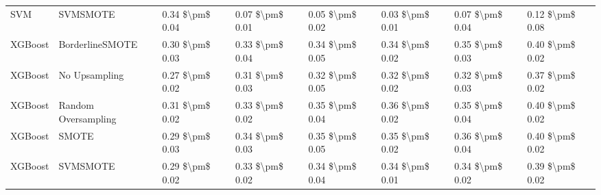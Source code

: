 \begin{tabular}{llllllll}
                            SVM &                      SVMSMOTE & 0.34 \$\textbackslash pm\$ 0.04 &           0.07 \$\textbackslash pm\$ 0.01 &       0.05 \$\textbackslash pm\$ 0.02 &        0.03 \$\textbackslash pm\$ 0.01 &                         0.07 \$\textbackslash pm\$ 0.04 & 0.12 \$\textbackslash pm\$ 0.08 \\
                        XGBoost &               BorderlineSMOTE & 0.30 \$\textbackslash pm\$ 0.03 &           0.33 \$\textbackslash pm\$ 0.04 &       0.34 \$\textbackslash pm\$ 0.05 &        0.34 \$\textbackslash pm\$ 0.02 &                         0.35 \$\textbackslash pm\$ 0.03 & 0.40 \$\textbackslash pm\$ 0.02 \\
                        XGBoost &                 No Upsampling & 0.27 \$\textbackslash pm\$ 0.02 &           0.31 \$\textbackslash pm\$ 0.03 &       0.32 \$\textbackslash pm\$ 0.05 &        0.32 \$\textbackslash pm\$ 0.02 &                         0.32 \$\textbackslash pm\$ 0.03 & 0.37 \$\textbackslash pm\$ 0.02 \\
                        XGBoost &           Random Oversampling & 0.31 \$\textbackslash pm\$ 0.02 &           0.33 \$\textbackslash pm\$ 0.02 &       0.35 \$\textbackslash pm\$ 0.04 &        0.36 \$\textbackslash pm\$ 0.02 &                         0.35 \$\textbackslash pm\$ 0.04 & 0.40 \$\textbackslash pm\$ 0.02 \\
                        XGBoost &                         SMOTE & 0.29 \$\textbackslash pm\$ 0.03 &           0.34 \$\textbackslash pm\$ 0.03 &       0.35 \$\textbackslash pm\$ 0.05 &        0.35 \$\textbackslash pm\$ 0.02 &                         0.36 \$\textbackslash pm\$ 0.04 & 0.40 \$\textbackslash pm\$ 0.02 \\
                        XGBoost &                      SVMSMOTE & 0.29 \$\textbackslash pm\$ 0.02 &           0.33 \$\textbackslash pm\$ 0.02 &       0.34 \$\textbackslash pm\$ 0.04 &        0.34 \$\textbackslash pm\$ 0.01 &                         0.34 \$\textbackslash pm\$ 0.02 & 0.39 \$\textbackslash pm\$ 0.02 \\
\bottomrule
\end{tabular}
